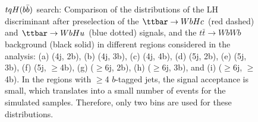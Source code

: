 \begin{figure}[htbp]
\begin{center}
 \\
 \\
\caption{$tqH(b\bar{b})$ search: Comparison of the distributions of the LH discriminant after preselection 
of the $\Hc$ (red dashed) and $\Hu$ (blue dotted) signals, 
and the $t\bar{t}\to WbWb$ background (black solid) in different regions considered in the analysis:
(a) (4j, 2b), (b) (4j, 3b), (c) (4j, 4b), (d) (5j, 2b), (e) (5j, 3b), (f) (5j, $\geq$4b), (g) ($\geq$6j, 2b), 
(h) ($\geq$6j, 3b), and (i) ($\geq$6j, $\geq$4b). 
In the regions with $\geq$4 $b$-tagged jets, the signal acceptance is small, which translates
into a small number of events for the simulated samples. Therefore, only two bins are used for these distributions.} 
\label{fig:LHD}
\end{center}
\end{figure}



